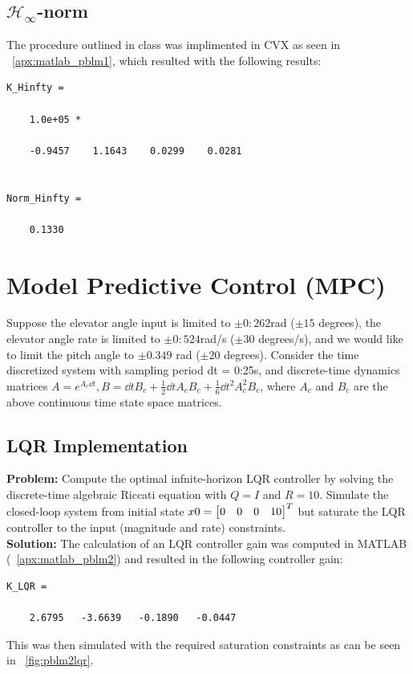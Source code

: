 \documentclass[letter]{article}
\begin{document}
\subsection{$\mathcal{H}_\infty$-norm}
The procedure outlined in class was implimented in CVX as seen in \appendixname \ \ref{apx:matlab_pblm1}, which resulted with the following results:
\begin{Verbatim}
K_Hinfty =

	1.0e+05 *

	-0.9457    1.1643    0.0299    0.0281


Norm_Hinfty =

	0.1330
\end{Verbatim}



\newpage
\section{Model Predictive Control (MPC)}
Suppose the elevator angle input is limited to $\pm0:262$rad ($\pm 15$ degrees), the elevator angle rate is limited to $\pm0:524$rad/s ($\pm 30$ degrees/s), and we would like to limit the pitch angle to $\pm 0.349$ rad ($\pm 20$ degrees). Consider the time discretized system with sampling period dt = 0:25s, and discrete-time dynamics matrices $A = e^{A_c \dd{t}}, B = \dd{t} B_c + \frac{1}{2} \dd{t} A_c B_c + \frac{1}{6} \dd{t}^2 A_c^2 B_c$, where $A_c$ and $B_c$ are the
above continuous time state space matrices.

\subsection{LQR Implementation}
\textbf{Problem:}
Compute the optimal infnite-horizon LQR controller by solving the discrete-time algebraic Riccati equation with $Q = I$ and $R = 10$.
Simulate the closed-loop system from initial state $x0 = \mqty[0 &0 &0 &10]^T$ but saturate the LQR controller to the input (magnitude and rate) constraints.\\

\noindent
\textbf{Solution:}
The calculation of an LQR controller gain was computed in MATLAB (\appendixname \ \ref{apx:matlab_pblm2}) and resulted in the following controller gain:
\begin{Verbatim}
K_LQR =
	
	2.6795   -3.6639   -0.1890   -0.0447
\end{Verbatim}

This was then simulated with the required saturation constraints as can be seen in \figurename \ \ref{fig:pblm2lqr}.
\end{document}
